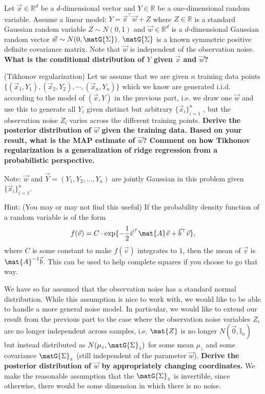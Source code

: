 \documentclass[preview]{standalone}
\begin{document}
\begin{Parts}
  \Part Let $\vec{x} \in \mathbb{R}^d$ be a $d$-dimensional vector and
  $Y \in \mathbb{R}$ be a one-dimensional random variable.  Assume a
  linear model: $Y=\vec{x}^\top\vec{w}+Z$ where $Z\in\mathbb{R}$ is
  a standard Gaussian random variable $Z \sim N(0,1)$ and
  $\vec{w}\in\mathbb{R}^d$ is a $d$-dimensional Gaussian random vector
  $\vec{w}\sim N(0,\matG{\Sigma})$. $\matG{\Sigma}$ is a known symmetric
  positive definite covariance matrix.  Note that $\vec{w}$ is independent
  of the observation noise.  {\bf What is the conditional distribution
    of $Y$ given $\vec{x}$ and $\vec{w}$?}



\Part (Tikhonov regularization) Let us assume that we are given $n$
training data points\\
$\{(\vec{x}_1,Y_1),(\vec{x}_2,Y_2),\cdots, (\vec{x}_n,Y_n)\}$ which we
know are generated i.i.d. according to the model of $(\vec{x},Y)$ in
the previous part, i.e. we draw one $\vec{w}$ and use this to generate
all $Y_i$ given distinct but arbitrary $\{\vec{x}_i\}_{i=1}^n$ , but
the observation noise $Z_i$ varies across the different training
points.  {\bf Derive the posterior distribution of $\vec{w}$ given the
  training data. Based on your result, what is the MAP estimate of
  $\vec{w}$?  Comment on how Tikhonov regularization is a
  generalization of ridge regression from a probabilistic
  perspective.}

Note: $\vec{w}$ and $\vec{Y} = (Y_1, Y_2, \ldots, Y_n)$ are jointly Gaussian in
this problem given $\{\vec{x}_i\}_{i=1}^n$.

Hint: (You may or may not find this useful) If the probability density function
of a random variable is of the form
\begin{align*}
f(\vec{v})=C \cdot\exp\{-\frac{1}{2}\vec{v}^\top\mat{A}\vec{v}+\vec{b}^\top \vec{v}\},
\end{align*}
where $C$ is some constant to make $f(\vec{v})$ integrates to $1$, then the mean
of $\vec{v}$ is $\mat{A}^{-1}\vec{b}$. This can be used to help complete squares
if you choose to go that way.



\Part We have so far assumed that the observation noise has a standard
normal distribution. While this assumption is nice to work with, we
would like to be able to handle a more general noise model. In
particular, we would like to extend our result from the previous part
to the case where the observation noise variables $Z_i$ are no longer
independent across samples, i.e.
$\mat{Z}$ is no longer
$N(\vec{0}, \mathbb{I}_n)$ but instead distributed as
$N(\mu_z, \matG{\Sigma}_z)$ for some mean $\mu_z$ and some covariance
$\matG{\Sigma}_z$ (still independent of the parameter $\vec{w}$).
{\bf Derive the posterior distribution of $\vec{w}$ by appropriately
  changing coordinates.} We make the reasonable assumption that the
$\matG{\Sigma}_z$ is invertible, since otherwise, there would be some
dimension in which there is no noise.\\


\end{Parts}
\end{document}
